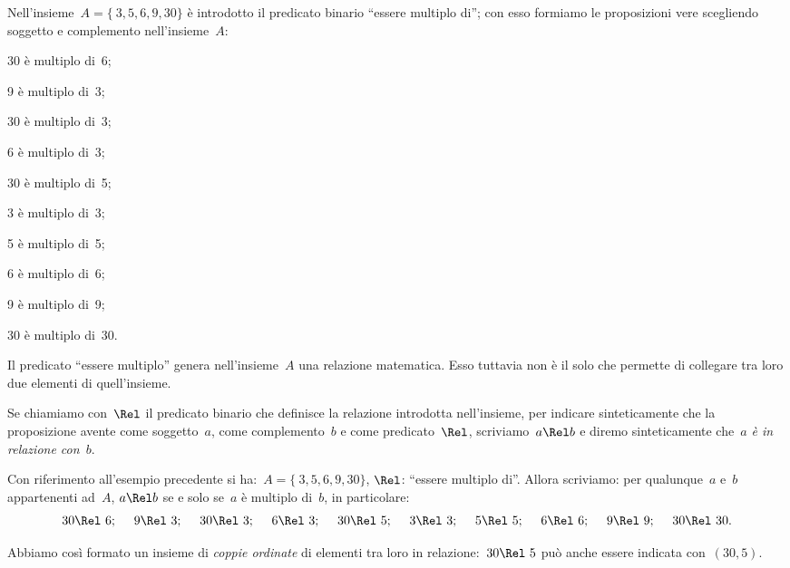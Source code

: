 \begin{exrig}
 \begin{esempio}
 Nell'insieme~\(A = \lbrace~3, 5, 6, 9, 30 \rbrace\) è introdotto il predicato 
binario ``essere multiplo di''; con esso formiamo le proposizioni vere 
scegliendo soggetto e
 complemento nell'insieme~\(A\):

\begin{multicols}{3}
30 è multiplo di~6;

9 è multiplo di~3;

30 è multiplo di~3;

6 è multiplo di~3;

30 è multiplo di~5;

3 è multiplo di~3;

5 è multiplo di~5;

6 è multiplo di~6;

9 è multiplo di~9;

30 è multiplo di~30.
\end{multicols}
Il predicato ``essere multiplo'' genera nell'insieme~\(A\) una relazione 
matematica. Esso tuttavia non è il
solo che permette di collegare tra loro due elementi di quell'insieme.
\end{esempio}
\end{exrig}


Se chiamiamo con~\(\Rel\) il predicato binario che definisce la relazione 
introdotta nell'insieme, per indicare sinteticamente
che la proposizione avente come soggetto~\(a\), come complemento~\(b\) e come 
predicato~\(\Rel\), scriviamo~\(a \Rel b\) e
diremo sinteticamente che~\emph{\(a\) è in relazione con~\(b\)}.

\begin{exrig}
 \begin{esempio}

Con riferimento all'esempio precedente si ha:~\(A = \lbrace~3,5,6,9,30 \rbrace\), 
\(\Rel\):
``essere multiplo di''. Allora scriviamo: per qualunque~\(a\) e~\(b\) appartenenti 
ad~\(A\),
\(a \Rel b\) se e solo se~\(a\) è multiplo di~\(b\), in particolare:
\[30 \Rel~6;\quad~9 \Rel~3;\quad~30 \Rel~3;\quad~6 \Rel~3;\quad~30 
\Rel~5;\quad~3 \Rel~3;\quad~5 \Rel~5;\quad~6 \Rel~6;\quad~9 \Rel~9;\quad~30 
\Rel~30.\]
\end{esempio}
\end{exrig}

Abbiamo così formato un insieme di \emph{coppie ordinate} di elementi tra loro 
in relazione:~\(30 \Rel~5\) può anche essere indicata con~\((30,5)\).

